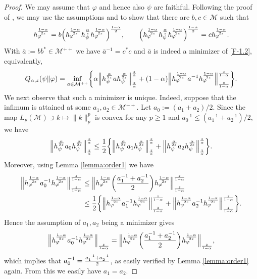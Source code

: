 \documentclass[12pt]{article}
\theoremstyle{definition}
\theoremstyle{remark}
\numberwithin{equation}{section}
\def\cM{\mathcal M}
\def\Me{\mathcal M}
\def\ffi{\varphi}
\begin{document}
\begin{proof} We may assume that $\varphi$ and hence also $\psi$ {are} faithful. Following
 the proof of \cite[Theorem 1(vi)]{kato2023onrenyi},  we may use the
assumptions and \cite[Lemma A.58]{hiai2021quantum} to show  that there are $b,c\in\cM$  such that
\begin{align}\label{eq:bc}
h_\ffi^{1-\alpha\over2z}
=b\Bigl(h_\ffi^{1-\alpha\over2z}h_\psi^{\alpha\over z}h_\ffi^{1-\alpha\over2z}\Bigr)^{1-\alpha\over2},\qquad
\Bigl(h_\ffi^{1-\alpha\over2z}h_\psi^{\alpha\over z}h_\ffi^{1-\alpha\over2z}\Bigr)^{1-\alpha\over2}
=ch_\ffi^{1-\alpha\over2z}.
\end{align}
With $\bar a:=bb^*\in\cM^{++}$ we have  $\bar a^{-1}=c^*c$ and $\bar a$ is indeed a minimizer of
\eqref{F-1.2}, equivalently,
\begin{align}\label{eq:infimum}
Q_{\alpha,z}(\psi\|\ffi)
=\inf_{a\in\cM^{++}}\biggl\{\alpha\Big\|h_\psi^{\alpha\over2z}ah_\psi^{\alpha\over2z}\Big\|_{z\over\alpha}^{z\over\alpha}
+(1-\alpha)\Big\|h_\ffi^{1-\alpha\over2z}a^{-1}h_\ffi^{1-\alpha\over2z}\Big\|_{z\over
1-\alpha}^{z\over 1-\alpha}\biggr\}.
\end{align}
We next observe that such a minimizer is unique. Indeed, suppose that the infimum is
attained  at some $a_1,a_2\in \Me^{++}$. Let $a_0:=(a_1+a_2)/2$. Since the map 
$L_{p}(\cM)\ni k\mapsto\|k\|_{p}^{p}$ is convex for any $p\ge 1$ and
$a_0^{-1}\le(a_1^{-1}+a_2^{-1})/2$, we have 
\[
\Big\|h_\psi^{\alpha\over2z}a_0h_\psi^{\alpha\over2z}\Big\|_{z\over\alpha}^{z\over\alpha}
\le{1\over2}\biggl\{\Big\|h_\psi^{\alpha\over2z}a_1
h_\psi^{\alpha\over2z}\Big\|_{z\over\alpha}^{z\over\alpha}
+\Big\|h_\psi^{\alpha\over2z}a_2h_\psi^{\alpha\over2z}\Big\|_{z\over\alpha}^{z\over\alpha}\biggr\}.
\]
Moreover, using Lemma \ref{lemma:order1} we have
\begin{align*}
\Big\|h_\ffi^{1-\alpha\over2z}a_0^{-1}h_\ffi^{1-\alpha\over2z}\Big\|_{z\over1-\alpha}^{z\over1-\alpha}
&\le\Big\|h_\ffi^{1-\alpha\over2z}\biggl({a_1^{-1}+a_2^{-1}\over2}\biggr)
h_\ffi^{1-\alpha\over2z}\Big\|_{z\over1-\alpha}^{z\over1-\alpha} \\
&\le{1\over2}\biggl\{\Big\|h_\ffi^{1-\alpha\over2z}a_1^{-1}
h_\ffi^{1-\alpha\over2z}\Big\|_{z\over1-\alpha}^{z\over1-\alpha}
+\Big\|h_\ffi^{1-\alpha\over2z}a_2^{-1}
h_\ffi^{1-\alpha\over2z}\Big\|_{z\over1-\alpha}^{z\over1-\alpha}\biggr\}.
\end{align*}
Hence the assumption of $a_1,a_2$ being a minimizer gives
\[
\Big\|h_\ffi^{1-\alpha\over2z}a_0^{-1}h_\ffi^{1-\alpha\over2z}\Big\|_{z\over1-\alpha}
=\Big\|h_\ffi^{1-\alpha\over2z}\biggl({a_1^{-1}+a_2^{-1}\over2}\biggr)
h_\ffi^{1-\alpha\over2z}\Big\|_{z\over1-\alpha},
\]
which implies that $a_0^{-1}={a_1^{-1}+a_2^{-1}\over2}$, as easily verified by Lemma \ref{lemma:order1}
again. From this we easily have $a_1=a_2$.


\end{proof}
\end{document}

